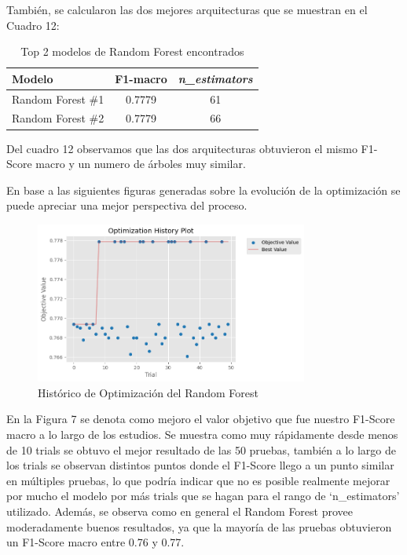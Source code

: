 \documentclass[12pt,a4paper]{article}
\begin{document}
También, se calcularon las dos mejores arquitecturas que se muestran en el Cuadro 12:

\begin{table}[htbp]
  \centering
  \begin{tabular}{lcc}
    \hline
    Modelo & F1-macro & \textit{n\_estimators} \\
    \hline
    Random Forest \#1 & 0.7779 & 61 \\
    Random Forest \#2 & 0.7779 & 66 \\
    \hline
  \end{tabular}
  \caption{Top 2 modelos de Random Forest encontrados}
  \label{tab:optuna-rf-top2}
\end{table}

Del cuadro 12 observamos que las dos arquitecturas obtuvieron el mismo F1-Score macro y un numero de árboles muy similar.

En base a las siguientes figuras generadas sobre la evolución de la optimización se puede apreciar una mejor
perspectiva del proceso.

\begin{figure}[H]
  \centering
  \includegraphics[width=0.8\textwidth]{../img/OptimizationHistoryDecisionForest.png}
  \caption{Histórico de Optimización del Random Forest}\label{fig:optimization-random-forest}
\end{figure}

En la Figura 7 se denota como mejoro el valor objetivo que fue nuestro F1-Score macro a lo largo de los estudios.
Se muestra como muy rápidamente desde menos de 10 trials se obtuvo el mejor resultado de las 50 pruebas,
también a lo largo de los trials se observan distintos puntos donde el F1-Score llego a un punto similar en
múltiples pruebas, lo que podría indicar que no es posible realmente mejorar por mucho el modelo
por más trials que se hagan para el rango de `n_estimators' utilizado. Además, se observa como en general
el Random Forest provee moderadamente buenos resultados, ya que la mayoría de las pruebas obtuvieron un F1-Score macro
entre 0.76 y 0.77.
\end{document}
